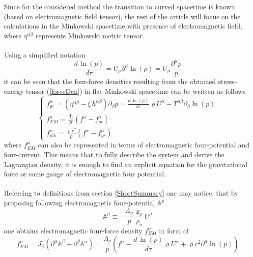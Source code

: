 \documentclass[aps,prx,preprint,groupedaddress,showkeys]{revtex4-2}
\newcommand{\mds}[1] {\frac{d {#1}}{d\tau}}
\begin{document}
Since for the considered method the transition to curved spacetime is known (based on electromagnetic field tensor), the rest of the article will focus on the calculations in the Minkowski spacetime with presence of electromagnetic field, where $\eta^{\alpha \beta}$ represents Minkowski metric tensor. \\
~\\
Using a simplified notation
\begin{equation} \label{simplfNot}
\mds{\, \ln{(p)}} = U_{\mu} \partial^{\mu} \ln{(p)} = U_{\mu} \frac{\partial^{\mu} p}{p}
\end{equation}
it can be seen that the four-force densities resulting from the obtained stress-energy tensor (\ref{forceDen}) in flat Minkowski spacetime can be written as follows
\begin{equation} \label{forceDenNew}
\begin{cases} 
f^{\alpha}_{gr} = \left ( \eta^{\alpha \beta} - \xi \, h^{\alpha \beta}  \right ) \partial_{\beta} p = \mds{\,\ln{(p)}} \varrho U^{\alpha} - T^{\alpha \beta}  \partial_{\beta} \ln{(p)}  \\
f^{\alpha}_{EM} = \frac{\Lambda_{\rho}}{p} \left ( f^{\alpha} - f^{\alpha}_{gr} \right )\\
f^{\alpha}_{oth} = \frac{\varrho c^2}{p} \left ( f^{\alpha} - f^{\alpha}_{gr} \right )
\end{cases}
\end{equation}
where $f^{\mu}_{EM}$ can also be represented in terms of electromagnetic four-potential and four-current. This means that to fully describe the system and derive the Lagrangian density, it is enough to find an explicit equation for the gravitational force or some gauge of electromagnetic four potential.\\
~\\
Referring to definitions from section \ref{ShortSummary} one may notice, that by proposing following electromagnetic four-potential $\mathbb{A}^{\mu}$
\begin{equation} \label{EM4pot}
\mathbb{A}^{\mu} \equiv - \frac{\Lambda_{\rho}}{p} \frac{\varrho_o}{\rho_o} U^{\mu}
\end{equation}
one obtains electromagnetic four-force density $f^{\alpha}_{EM}$ in form of
\begin{equation} \label{EM4EMf}
f^{\alpha}_{EM} = J_{\beta} \left ( \partial^{\alpha}\mathbb{A}^{\beta} - \partial^{\beta}\mathbb{A}^{\alpha} \right ) = \frac{\Lambda_{\rho}}{p} \left ( f^{\alpha} - \mds{\,\ln{(p)}} \varrho U^{\alpha} + \varrho c^2 \partial^{\alpha} \ln{(p)}  \right )
\end{equation}
\end{document}
